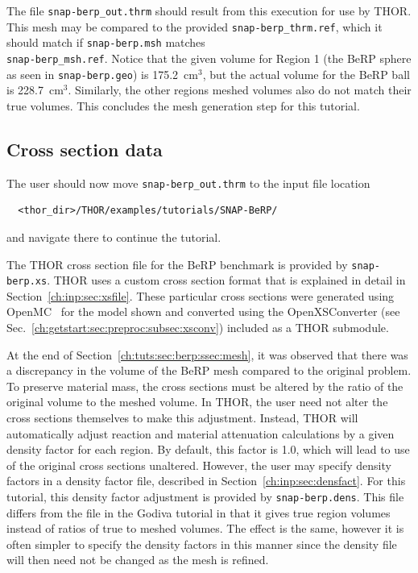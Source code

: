 The file \verb"snap-berp_out.thrm" should result from this execution for use by \ac{THOR}.
This mesh may be compared to the provided \verb"snap-berp_thrm.ref", which it should match if \verb"snap-berp.msh" matches \\
\verb"snap-berp_msh.ref".
Notice that the given volume for Region 1 (the BeRP sphere as seen in \verb"snap-berp.geo") is 175.2~cm$^3$, but the actual volume for the BeRP ball is 228.7~cm$^3$.
Similarly, the other regions meshed volumes also do not match their true volumes.
This concludes the mesh generation step for this tutorial.

\subsection{Cross section data}

The user should now move \verb"snap-berp_out.thrm" to the input file location
\begin{verbatim}
  <thor_dir>/THOR/examples/tutorials/SNAP-BeRP/
\end{verbatim}
and navigate there to continue the tutorial.

The \ac{THOR} cross section file for the BeRP benchmark is provided by \verb"snap-berp.xs".
\ac{THOR} uses a custom cross section format that is explained in detail in Section~\ref{ch:inp:sec:xsfile}.
These particular cross sections were generated using OpenMC~\cite{openmc} for the model shown and converted using the OpenXSConverter (see Sec.~\ref{ch:getstart:sec:preproc:subsec:xsconv}) included as a THOR submodule.

At the end of Section~\ref{ch:tuts:sec:berp:ssec:mesh}, it was observed that there was a discrepancy in the volume of the BeRP mesh compared to the original problem.
To preserve material mass, the cross sections must be altered by the ratio of the original volume to the meshed volume.
In \ac{THOR}, the user need not alter the cross sections themselves to make this adjustment.
Instead, \ac{THOR} will automatically adjust reaction and material attenuation calculations by a given density factor for each region.
By default, this factor is 1.0, which will lead to use of the original cross sections unaltered.
However, the user may specify density factors in a density factor file, described in Section~\ref{ch:inp:sec:densfact}.
For this tutorial, this density factor adjustment is provided by \verb"snap-berp.dens".
This file differs from the file in the Godiva tutorial in that it gives true region volumes instead of ratios of true to meshed volumes.
The effect is the same, however it is often simpler to specify the density factors in this manner since the density file will then need not be changed as the mesh is refined.

